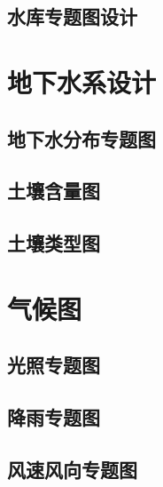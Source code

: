 \subsection{水库专题图设计}
\section{地下水系设计}
\subsection{地下水分布专题图}
\subsection{土壤含量图}
\subsection{土壤类型图}
\section{气候图}
\subsection{光照专题图}
\subsection{降雨专题图}
\subsection{风速风向专题图}


